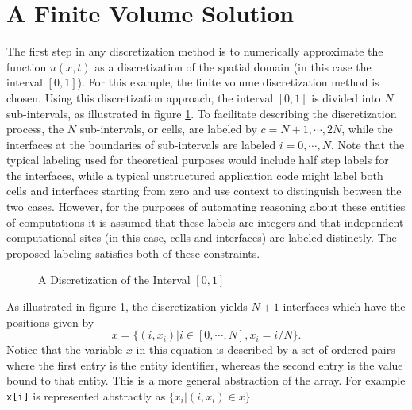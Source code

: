 \documentclass[10pt,epsf]{book}
\begin{document}
\section{A Finite Volume Solution}

The first step in any discretization method is to numerically
approximate the function $u(x,t)$ as a discretization of the
spatial domain (in this case the interval $[0,1]$).  For this example,
the finite volume discretization method is chosen.  Using
this discretization approach, the interval $[0,1]$ is divided into $N$
sub-intervals, as illustrated in figure \ref{fig3:oned}.  To
facilitate describing the discretization process, the $N$
sub-intervals, or cells, are labeled by $c = N+1, \cdots, 2N$, while
the interfaces at the boundaries of sub-intervals are labeled $i = 0,
\cdots, N$.  Note that the typical labeling used for theoretical
purposes would include half step labels for the interfaces, while a
typical unstructured application code might label both cells and
interfaces starting from zero and use context to distinguish between
the two cases.  However, for the purposes of automating reasoning
about these entities of computations it is assumed that these labels
are integers and that independent computational sites (in this case,
cells and interfaces) are labeled distinctly.  The proposed labeling
satisfies both of these constraints.

\begin{figure}[htbp]
 \centerline{
  \epsfxsize=5.50in
  }
 \caption{A Discretization of the Interval $[0,1]$}
 \label{fig3:oned}
\end{figure}

As illustrated in figure \ref{fig3:oned}, the discretization yields
$N+1$ interfaces which have the positions given by
\begin{equation}
x = \lbrace (i,x_i) | i \in [0, \cdots, N], x_i = i/N \rbrace.
\label{eq3:interfacex}
\end{equation}
Notice that the variable $x$ in this equation is described by a set of
ordered pairs where the first entry is the entity identifier, whereas
the second entry is the value bound to that entity.  This is a more
general abstraction of the array.  For example {\tt x[i]} is
represented abstractly as $\lbrace x_i | (i,x_i) \in x \rbrace$.
\end{document}
